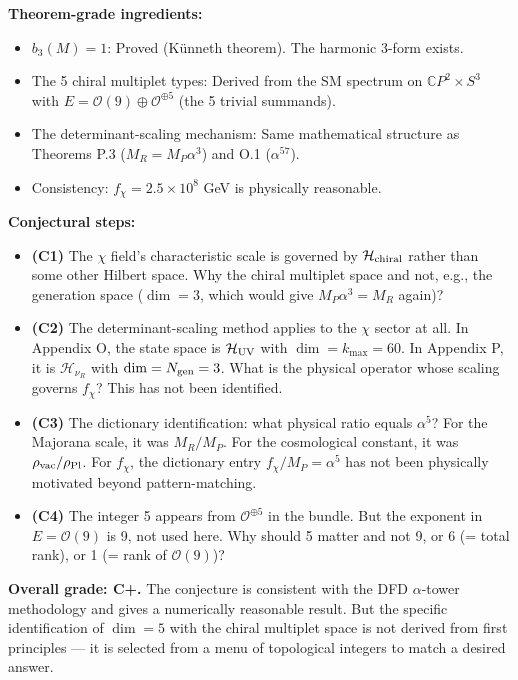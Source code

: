 \documentclass[11pt]{article}
\theoremstyle{definition}
\theoremstyle{remark}
\newcommand{\CP}{\mathbb{C}P}
\begin{document}
\begin{tcolorbox}[colback=yellow!5!white, colframe=yellow!60!black,
  title=Honest Assessment: What Is and Is Not Proved]

\textbf{Theorem-grade ingredients:}
\begin{itemize}
\item $b_3(M) = 1$: Proved (K\"unneth theorem). The harmonic 3-form exists.
\item The 5 chiral multiplet types: Derived from the SM spectrum on $\CP^2 \times S^3$
  with $E = \mathcal{O}(9) \oplus \mathcal{O}^{\oplus 5}$ (the 5 trivial summands).
\item The determinant-scaling mechanism: Same mathematical structure as
  Theorems P.3 ($M_R = M_P\alpha^3$) and O.1 ($\alpha^{57}$).
\item Consistency: $f_\chi = 2.5 \times 10^8$ GeV is physically reasonable.
\end{itemize}

\textbf{Conjectural steps:}
\begin{itemize}
\item \textbf{(C1)} The $\chi$ field's characteristic scale is governed by
  $\mathcal{H}_{\rm chiral}$ rather than some other Hilbert space. Why the
  chiral multiplet space and not, e.g., the generation space ($\dim = 3$,
  which would give $M_P\alpha^3 = M_R$ again)?

\item \textbf{(C2)} The determinant-scaling method applies to the $\chi$
  sector at all. In Appendix O, the state space is $\mathcal{H}_{\rm UV}$
  with $\dim = k_{\max} = 60$. In Appendix P, it is $\mathcal{H}_{\nu_R}$
  with $\dim = N_{\rm gen} = 3$. What is the physical operator whose scaling
  governs $f_\chi$? This has not been identified.

\item \textbf{(C3)} The dictionary identification: what physical ratio equals
  $\alpha^5$? For the Majorana scale, it was $M_R/M_P$. For the cosmological
  constant, it was $\rho_{\rm vac}/\rho_{\rm Pl}$. For $f_\chi$, the dictionary
  entry $f_\chi/M_P = \alpha^5$ has not been physically motivated beyond
  pattern-matching.

\item \textbf{(C4)} The integer 5 appears from $\mathcal{O}^{\oplus 5}$ in the
  bundle. But the exponent in $E = \mathcal{O}(9)$ is 9, not used here. Why
  should 5 matter and not 9, or 6 (= total rank), or 1 (= rank of
  $\mathcal{O}(9)$)?
\end{itemize}

\textbf{Overall grade: C+.} The conjecture is consistent with the DFD
$\alpha$-tower methodology and gives a numerically reasonable result. But
the specific identification of $\dim = 5$ with the chiral multiplet space
is not derived from first principles --- it is selected from a menu of
topological integers to match a desired answer.
\end{tcolorbox}
\end{document}
